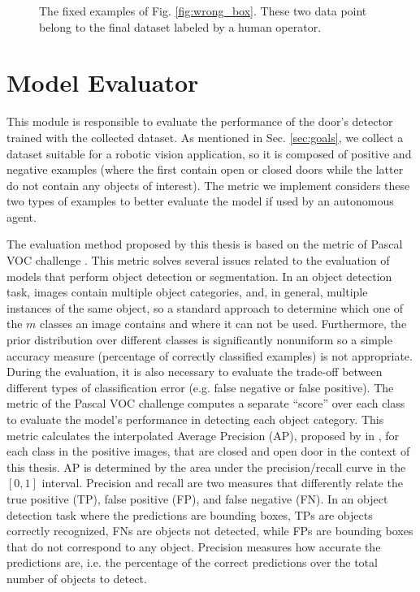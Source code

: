 \begin{figure}[h!]
	\caption{The fixed examples of Fig. \ref{fig:wrong_box}. These two data point belong to the final dataset labeled by a human operator.}
	\label{fig:correct_box}
\end{figure}

\section{Model Evaluator}
\label{sec:model_evaluator}
This module is responsible to evaluate the performance of the door's detector trained with the collected dataset. As mentioned in Sec. \ref{sec:goals}, we collect a dataset suitable for a robotic vision application, so it is composed of positive and negative examples (where the first contain open or closed doors while the latter do not contain any objects of interest). The metric we implement considers these two types of examples to better evaluate the model if used by an autonomous agent. 

The evaluation method proposed by this thesis is based on the metric of Pascal VOC challenge \cite{pascal}. This metric solves several issues related to the evaluation of models that perform object detection or segmentation. In an object detection task, images contain multiple object categories, and, in general,  multiple instances of the same object, so a standard approach to determine which one of the $m$ classes an image contains and where it can not be used. Furthermore, the prior distribution over different classes is significantly nonuniform so a
simple accuracy measure (percentage of correctly classified
examples) is not appropriate. During the evaluation, it is also necessary
to evaluate the trade-off between different types of classification error (e.g. false negative or false positive). The metric of the Pascal VOC challenge computes a separate ``score'' over each class to evaluate the model's performance in detecting each object category.  This metric calculates the interpolated Average Precision (AP), proposed by \citeauthor{averageprecision} in \cite{averageprecision}, for each class in the positive images, that are closed and open door in the context of this thesis. AP is determined by the area under the precision/recall curve in the $[0, 1]$ interval. Precision and recall are two measures that differently relate the true positive (TP), false positive (FP), and false negative (FN). In an object detection task where the predictions are bounding boxes, TPs are objects correctly recognized, FNs are objects not detected, while FPs are bounding boxes that do not correspond to any object. Precision measures how accurate the predictions are, i.e. the percentage of the correct predictions over the total number of objects to detect.

